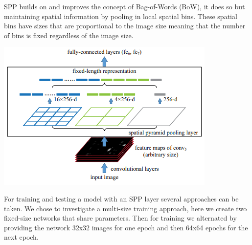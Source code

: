 \documentclass{article}
\begin{document}
SPP builds on and improves the concept of Bag-of-Words (BoW), it does so but maintaining spatial information by pooling in local spatial bins. These spatial bins have sizes that are proportional to the image size meaning that the number of bins is fixed regardless of the image size.

\includegraphics{spp}

For training and testing a model with an SPP layer several approaches can be taken. We chose to investigate a multi-size training approach, here we create two fixed-size networks that share parameters. Then for training we alternated by providing the network 32x32 images for one epoch and then 64x64 epochs for the next epoch. 
\end{document}
